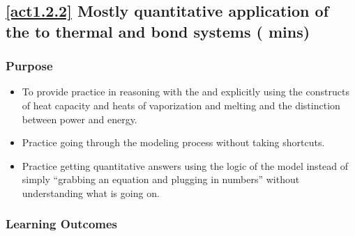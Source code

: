 %
%	
%
%
%

\subsection*{\ref{act1.2.2}	Mostly quantitative application of the \EnergyInteractionModel{} to thermal and bond systems		( mins)}
\subsubsection*{Purpose}

\begin{itemize}
	\item To provide practice in reasoning with the \EnergyInteractionModel{} and explicitly using the constructs of heat capacity and heats of vaporization and melting and the distinction between power and energy.
	\item Practice going through the modeling process without taking shortcuts.
	\item Practice getting quantitative answers using the logic of the model instead of simply ``grabbing an equation and plugging in numbers'' without understanding what is going on.
\end{itemize}

\subsubsection*{Learning Outcomes}

